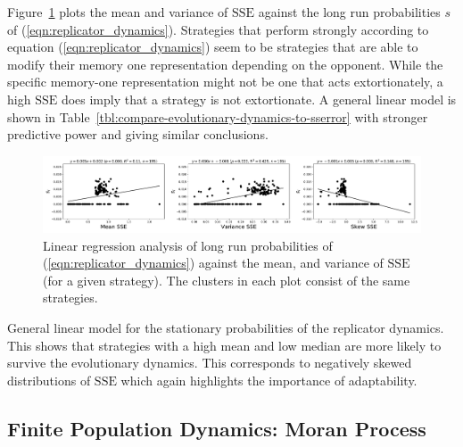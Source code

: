 \documentclass[a4paper]{article}
\newcommand{\SSe}{\text{SSE}}
\begin{document}
Figure~\ref{fig:compare-evolutionary-dynamics-to-sserror} plots the mean and
variance of \(\SSe\) against the long run
probabilities \(s\) of (\ref{eqn:replicator_dynamics}). Strategies that perform
strongly according to equation
(\ref{eqn:replicator_dynamics}) seem to be strategies that are able to modify
their memory one representation depending on the opponent. While the specific
memory-one representation might not be one that acts extortionately, a high
\(\SSe\) does imply that a strategy is not extortionate. A general linear
model is shown in Table~\ref{tbl:compare-evolutionary-dynamics-to-sserror} with
stronger predictive power and giving similar conclusions.

\begin{figure}[!hbtp]
    \centering
    \includegraphics[width=\textwidth]{./assets/img/compare-evolutionary-dynamics-to-sserror/main.pdf}
    \caption{Linear regression analysis of long run probabilities of
    (\ref{eqn:replicator_dynamics}) against the mean, and variance
    of \(\SSe\) (for a given strategy). The clusters in each plot consist of the
    same strategies.}
    \label{fig:compare-evolutionary-dynamics-to-sserror}
\end{figure}

\begin{table}[!hbtp]
    \begin{center}
    \tiny
    
    \end{center}
    \caption{General linear model for the stationary probabilities of the
    replicator dynamics. This shows that strategies with a high mean
    and low median are more likely to survive the evolutionary dynamics. This
    corresponds to negatively skewed distributions of \(\SSe\) which again
    highlights the importance of adaptability.}
    \label{tbl:compare-evolutionary-dynamics-to-sserror}
\end{table}

\subsection{Finite Population Dynamics: Moran Process}
\end{document}
